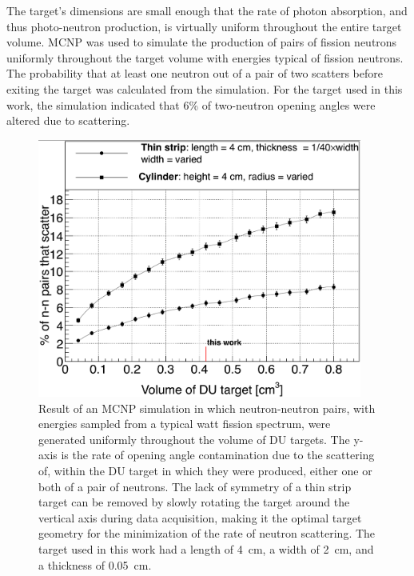 The target's dimensions are small enough that the rate of photon absorption, and thus photo-neutron production, is virtually uniform throughout the entire target volume.
MCNP was used to simulate the production of pairs of fission neutrons uniformly throughout the target volume with energies typical of fission neutrons.
The probability that at least one neutron out of a pair of two scatters before exiting the target was calculated from the simulation.
For the target used in this work, the simulation indicated that 6\% of two-neutron opening angles were altered due to scattering.
\begin{figure}
    \centering
    \includegraphics[width = 0.95\textwidth]{Content/Errors/ElasticScatteringPlot.png}
    \caption{
     Result of an MCNP simulation in which neutron-neutron pairs, with energies sampled from a typical watt fission spectrum, were generated uniformly throughout the volume of DU targets.
        The y-axis is the rate of opening angle contamination due to the scattering of, within the DU target in which they were produced, either one or both of a pair of neutrons.
    The lack of symmetry of a thin strip target can be removed by slowly rotating the target around the vertical axis during data acquisition, making it the optimal target geometry for the minimization of the rate of neutron scattering.
    The target used in this work had a length of 4~cm, a width of 2~cm, and a thickness of 0.05~cm.
    }
    \label{fig:ElasticScatteringPlot}
\end{figure}
